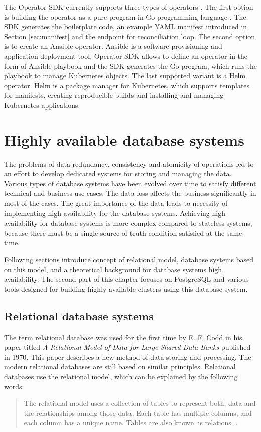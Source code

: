 \documentclass[
  digital, %
  twoside, %
  table,   %
  nolof,   %
  nolot,   %
]{fithesis3}
\begin{document}
The Operator SDK currently supports three types of operators \cite{operatorhub-sdk}. The first option is building the operator as a pure program in Go programming language \cite{golang}. The SDK generates the boilerplate code, an example YAML manifest introduced in Section \ref{sec:manifest} and the endpoint for reconciliation loop. The second option is to create an Ansible operator. Ansible \cite{ansible} is a software provisioning and application deployment tool. Operator SDK allows to define an operator in the form of Ansible playbook \cite{wwp} and the SDK generates the Go program, which runs the playbook to manage Kubernetes objects. The last supported variant is a Helm operator. Helm \cite{helm} is a package manager for Kubernetes, which supports templates for manifests, creating reproducible builds and installing and managing Kubernetes applications.


\chapter{Highly available database systems} \label{chap:ha_database_systems}
The problems of data redundancy, consistency and atomicity of operations led to an effort to develop dedicated systems for storing and managing the data. Various types of database systems have been evolved over time to satisfy different technical and business use cases. The data loss affects the business significantly in most of the cases. The great importance of the data leads to necessity of implementing high availability for the database systems. Achieving high availability for database systems is more complex compared to stateless systems, because there must be a single source of truth condition satisfied at the same time.

Following sections introduce concept of relational model, database systems based on this model, and a theoretical background for database systems high availability. The second part of this chapter focuses on PostgreSQL and various tools designed for building highly available clusters using this database system.

\section{Relational database systems}
The term relational database was used for the first time by E. F. Codd in his paper titled \textit{A Relational Model of Data for Large Shared Data Banks} \cite{codd_relational_model} published in 1970. This paper describes a new method of data storing and processing. The modern relational databases are still based on similar principles. Relational databases use the relational model, which can be explained by the following words:
\begin{quote}
The relational model uses a collection of tables to represent both, data and the relationships among those data. Each table has multiple columns, and each column has a unique name. Tables are also known as relations. \cite[p. 9]{db}.
\end{quote}
\end{document}
